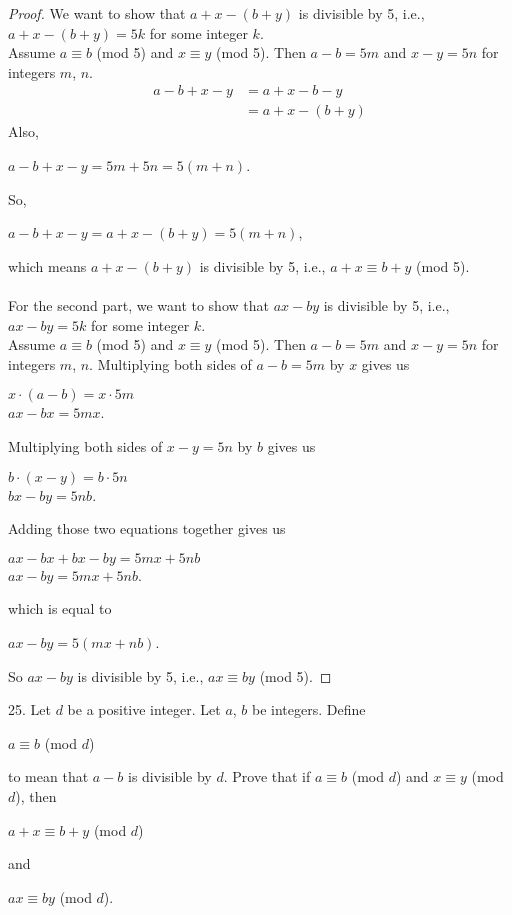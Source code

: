 \documentclass[12pt]{article}
\begin{document}
\begin{proof}
We want to show that $a+x-(b+y)$ is divisible by 5, i.e., $a+x-(b+y)=5k$ for some integer $k$. \\
Assume $a\equiv b$ (mod 5) and $x\equiv y$ (mod 5). Then $a-b=5m$ and $x-y=5n$ for integers $m$, $n$.
\begin{align*}
a-b+x-y&=a+x-b-y \\
&=a+x-(b+y)
\end{align*}
Also,
\begin{center}
$a-b+x-y=5m+5n=5(m+n)$.
\end{center}
So,
\begin{center}
$a-b+x-y=a+x-(b+y)=5(m+n)$,
\end{center}
which means $a+x-(b+y)$ is divisible by 5, i.e., $a+x\equiv b+y$ (mod 5). \\
\\
For the second part, we want to show that $ax-by$ is divisible by 5, i.e., $ax-by=5k$ for some integer $k$. \\
Assume $a\equiv b$ (mod 5) and $x\equiv y$ (mod 5). Then $a-b=5m$ and $x-y=5n$ for integers $m$, $n$.
Multiplying both sides of $a-b=5m$ by $x$ gives us
\begin{center}
$x\cdot(a-b)=x\cdot5m$ \\
$ax-bx=5mx$.
\end{center}
Multiplying both sides of $x-y=5n$ by $b$ gives us
\begin{center}
$b\cdot(x-y)=b\cdot5n$ \\
$bx-by=5nb$.
\end{center}
Adding those two equations together gives us
\begin{center}
$ax-bx+bx-by=5mx+5nb$ \\
$ax-by=5mx+5nb$.
\end{center}
which is equal to
\begin{center}
$ax-by=5(mx+nb)$.
\end{center}
So $ax-by$ is divisible by 5, i.e., $ax\equiv by$ (mod 5).
\end{proof}
25. Let $d$ be a positive integer. Let $a$, $b$ be integers. Define
\begin{center}
$a\equiv b$ (mod $d$)
\end{center}
to mean that $a-b$ is divisible by $d$. Prove that if $a\equiv b$ (mod $d$) and $x\equiv y$ (mod $d$), then
\begin{center}
$a+x\equiv b+y$ (mod $d$)
\end{center}
and
\begin{center}
$ax\equiv by$ (mod $d$).
\end{center}
\end{document}
